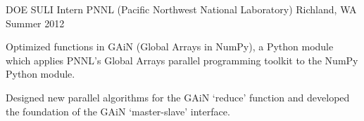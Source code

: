\begin{cventries}
  \cventry
    {DOE SULI Intern} %
    {PNNL (Pacific Northwest National Laboratory)} %
    {Richland, WA} %
    {Summer 2012} %
    {
      \begin{cvitems} %
        \item {Optimized functions in GAiN (Global Arrays in NumPy), a Python module which applies PNNL’s Global Arrays parallel
        programming toolkit to the NumPy Python module.}
        \item {Designed new parallel algorithms for the GAiN `reduce' function and developed the foundation of the GAiN `master-slave' interface.}
      \end{cvitems} 
    }


\end{cventries}
